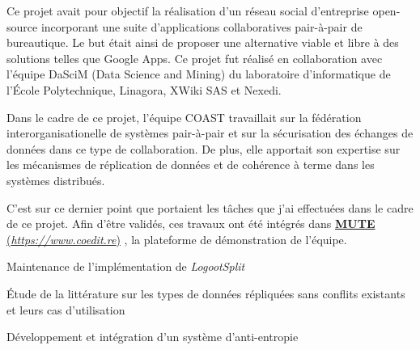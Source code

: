 \documentclass[12pt, a4paper]{awesome-cv}
\newcommand{\customlink}[2]{
  \href{#2}{\textbf{#1} (\emph{#2})}
}
\begin{document}
\begin{cventries}

  \begin{cvparagraph}
    Ce projet avait pour objectif la réalisation d'un réseau social d'entreprise open-source incorporant une suite d'applications collaboratives pair-à-pair de bureautique.
    Le but était ainsi de proposer une alternative viable et libre à des solutions telles que Google Apps. Ce projet fut réalisé en collaboration avec l’équipe DaSciM (Data Science and Mining) du laboratoire d’informatique de l’École Polytechnique, Linagora, XWiki SAS et Nexedi.

    Dans le cadre de ce projet, l'équipe COAST travaillait sur la fédération interorganisationelle de systèmes pair-à-pair et sur la sécurisation des échanges de données dans ce type de collaboration. De plus, elle apportait son expertise sur les mécanismes de réplication de données et de cohérence à terme dans les systèmes distribués.

    C'est sur ce dernier point que portaient les tâches que j'ai effectuées dans le cadre de ce projet.
    Afin d'être validés, ces travaux ont été intégrés dans \customlink{MUTE}{https://www.coedit.re}, la plateforme de démonstration de l'équipe.

    \begin{tightemize}
      \item Maintenance de l'implémentation de \emph{LogootSplit}
      \item Étude de la littérature sur les types de données répliquées sans conflits existants et leurs cas d'utilisation
      \item Développement et intégration d'un système d'anti-entropie
    \end{tightemize}

    \begin{description}[labelindent=1.6em,itemsep=-0.3em]
      \item {}
    \end{description}
  \end{cvparagraph}


\end{cventries}
\end{document}
